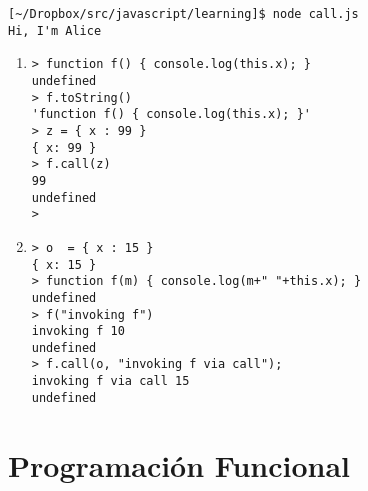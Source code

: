 \begin{verbatim}
[~/Dropbox/src/javascript/learning]$ node call.js
Hi, I'm Alice
\end{verbatim}

\begin{enumerate}
\item 
{}
\begin{verbatim}
> function f() { console.log(this.x); }
undefined
> f.toString()
'function f() { console.log(this.x); }'
> z = { x : 99 }
{ x: 99 }
> f.call(z)
99
undefined
> 
\end{verbatim}
\item 
\begin{verbatim}
> o  = { x : 15 }
{ x: 15 }
> function f(m) { console.log(m+" "+this.x); }
undefined
> f("invoking f")
invoking f 10
undefined
> f.call(o, "invoking f via call");
invoking f via call 15
undefined
\end{verbatim}
\end{enumerate}


\section{Programación Funcional}

